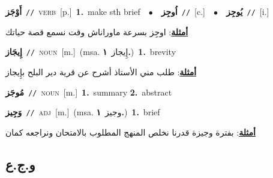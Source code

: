 \documentclass[10pt,a4paper,twoside]{article} %
\begin{document}
\begin{multicols}{2}
{\setlength\topsep{0pt}\textbf{\foreignlanguage{arabic}{أَوْجَز}}\ {\color{gray}\texttt{//}\color{black}}\ \textsc{verb}\ [p.]\ \textbf{1.}~make sth brief\ \ $\bullet$\ \ \setlength\topsep{0pt}\textbf{\foreignlanguage{arabic}{اُوجِز}}\ {\color{gray}\texttt{//}\color{black}}\ [c.]\ \ $\bullet$\ \ \setlength\topsep{0pt}\textbf{\foreignlanguage{arabic}{يُوجِز}}\ {\color{gray}\texttt{//}\color{black}}\ [i.]\  \begin{flushright}\color{gray}\foreignlanguage{arabic}{\textbf{\underline{\foreignlanguage{arabic}{أمثلة}}}: اوجِز بسرعة ماوراناش وقت نسمع قصة حياتك}\end{flushright}\color{black}} \vspace{2mm}

{\setlength\topsep{0pt}\textbf{\foreignlanguage{arabic}{إِيجَاز}}\ {\color{gray}\texttt{//}\color{black}}\ \textsc{noun}\ [m.]\ \color{gray}(msa. \foreignlanguage{arabic}{إِيجاز}~\foreignlanguage{arabic}{\textbf{١.}})\color{black}\ \textbf{1.}~brevity\  \begin{flushright}\color{gray}\foreignlanguage{arabic}{\textbf{\underline{\foreignlanguage{arabic}{أمثلة}}}: طلب مني الأستاذ أشرح عن قرية دير البلح بإِيجاز}\end{flushright}\color{black}} \vspace{2mm}

{\setlength\topsep{0pt}\textbf{\foreignlanguage{arabic}{مُوجَز}}\ {\color{gray}\texttt{//}\color{black}}\ \textsc{noun}\ [m.]\ \textbf{1.}~summary  \textbf{2.}~abstract\ } \vspace{2mm}

{\setlength\topsep{0pt}\textbf{\foreignlanguage{arabic}{وَجِيز}}\ {\color{gray}\texttt{//}\color{black}}\ \textsc{adj}\ [m.]\ \color{gray}(msa. \foreignlanguage{arabic}{وجيز}~\foreignlanguage{arabic}{\textbf{١.}})\color{black}\ \textbf{1.}~brief\  \begin{flushright}\color{gray}\foreignlanguage{arabic}{\textbf{\underline{\foreignlanguage{arabic}{أمثلة}}}: بفترة وجيزة قدرنا نخلص المنهج المطلوب بالامتحان ونراجعه كمان}\end{flushright}\color{black}} \vspace{2mm}

\vspace{-3mm}
\subsection*{\color{blue}\foreignlanguage{arabic}{و.ج.ع}\color{blue}{}} 


\end{multicols}
\end{document}
